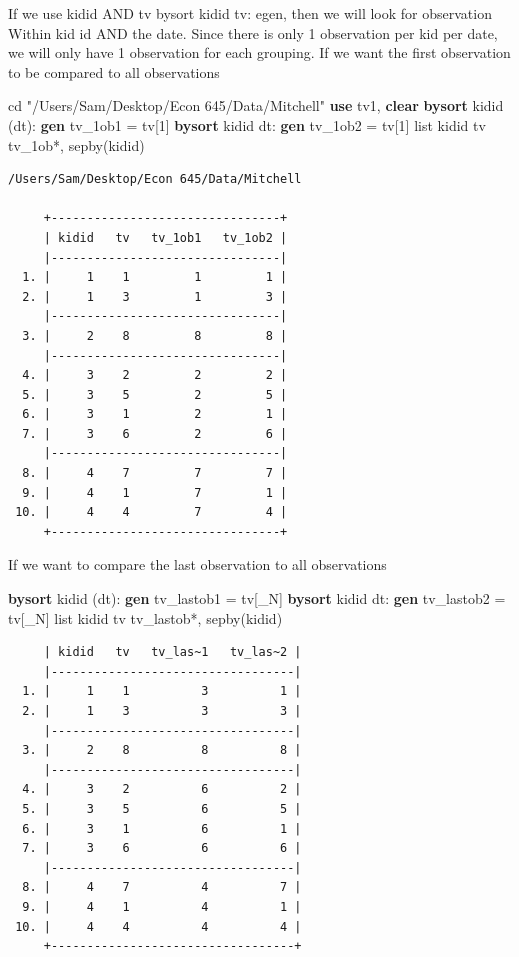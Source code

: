 \documentclass[
]{book}
\newenvironment{Shaded}{\begin{snugshade}}{\end{snugshade}}
\newcommand{\KeywordTok}[1]{\textcolor[rgb]{0.13,0.29,0.53}{\textbf{#1}}}
\newcommand{\NormalTok}[1]{#1}
\newcommand{\OtherTok}[1]{\textcolor[rgb]{0.56,0.35,0.01}{#1}}
\newcommand{\StringTok}[1]{\textcolor[rgb]{0.31,0.60,0.02}{#1}}
\begin{document}
If we use kidid AND tv bysort kidid tv: egen, then we will look for observation
Within kid id AND the date. Since there is only 1 observation per kid
per date, we will only have 1 observation for each grouping.
If we want the first observation to be compared to all observations

\begin{Shaded}
\begin{Highlighting}[]
\NormalTok{cd }\StringTok{"/Users/Sam/Desktop/Econ 645/Data/Mitchell"}
\KeywordTok{use}\NormalTok{ tv1, }\KeywordTok{clear}
\KeywordTok{bysort}\NormalTok{ kidid (dt): }\KeywordTok{gen}\NormalTok{ tv\_1ob1 = tv[1]}
\KeywordTok{bysort}\NormalTok{ kidid dt: }\KeywordTok{gen}\NormalTok{ tv\_1ob2 = tv[1]}
\OtherTok{list}\NormalTok{ kidid tv tv\_1ob*, sepby(kidid)}
\end{Highlighting}
\end{Shaded}

\begin{verbatim}
/Users/Sam/Desktop/Econ 645/Data/Mitchell

     +--------------------------------+
     | kidid   tv   tv_1ob1   tv_1ob2 |
     |--------------------------------|
  1. |     1    1         1         1 |
  2. |     1    3         1         3 |
     |--------------------------------|
  3. |     2    8         8         8 |
     |--------------------------------|
  4. |     3    2         2         2 |
  5. |     3    5         2         5 |
  6. |     3    1         2         1 |
  7. |     3    6         2         6 |
     |--------------------------------|
  8. |     4    7         7         7 |
  9. |     4    1         7         1 |
 10. |     4    4         7         4 |
     +--------------------------------+
\end{verbatim}

If we want to compare the last observation to all observations

\begin{Shaded}
\begin{Highlighting}[]
\KeywordTok{bysort}\NormalTok{ kidid (dt): }\KeywordTok{gen}\NormalTok{ tv\_lastob1 = tv[\_N]}
\KeywordTok{bysort}\NormalTok{ kidid dt: }\KeywordTok{gen}\NormalTok{ tv\_lastob2 = tv[\_N]}
\OtherTok{list}\NormalTok{ kidid tv tv\_lastob*, sepby(kidid)}
\end{Highlighting}
\end{Shaded}

\begin{verbatim}
     | kidid   tv   tv_las~1   tv_las~2 |
     |----------------------------------|
  1. |     1    1          3          1 |
  2. |     1    3          3          3 |
     |----------------------------------|
  3. |     2    8          8          8 |
     |----------------------------------|
  4. |     3    2          6          2 |
  5. |     3    5          6          5 |
  6. |     3    1          6          1 |
  7. |     3    6          6          6 |
     |----------------------------------|
  8. |     4    7          4          7 |
  9. |     4    1          4          1 |
 10. |     4    4          4          4 |
     +----------------------------------+
\end{verbatim}
\end{document}
